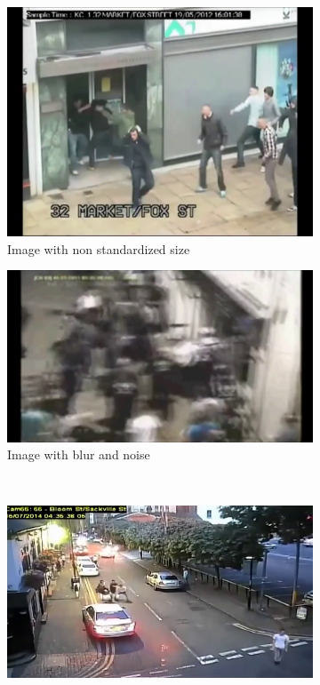 \begin{figure}[]
    \centering
    \begin{subfigure}{.5\textwidth}
        \centering
        \includegraphics[width=\linewidth]{./images/V72-008.png}
        \caption{Image with non standardized size}
        \label{fig:sub1}
    \end{subfigure}%
    \begin{subfigure}{.5\textwidth}
        \centering
        \includegraphics[width=\linewidth]{./images/V64-054.png}
        \caption{Image with blur and noise}
        \label{fig:sub2}
    \end{subfigure}\\
    \begin{subfigure}{.5\textwidth}
        \centering
        \includegraphics[width=\linewidth]{./images/V79-012.png}

\end{subfigure}
\end{figure}
